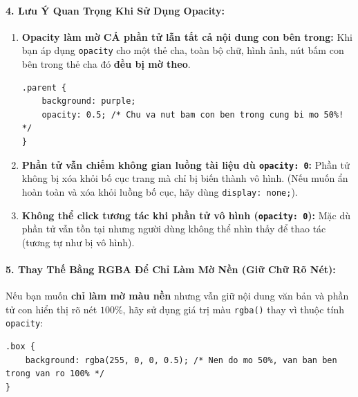 \documentclass[11pt,oneside]{book}
\newcommand{\codeinline}[1]{\textcolor{accentOrange}{\texttt{#1}}}
\begin{document}
\paragraph{4. Lưu Ý Quan Trọng Khi Sử Dụng Opacity:}

\begin{warnBox}
\begin{enumerate}[leftmargin=1.5em, itemsep=4pt, parsep=0pt]
    \item \textbf{Opacity làm mờ CẢ phần tử lẫn tất cả nội dung con bên trong:} Khi bạn áp dụng \codeinline{opacity} cho một thẻ cha, toàn bộ chữ, hình ảnh, nút bấm con bên trong thẻ cha đó \textbf{đều bị mờ theo}.
\begin{codeWindow}
\begin{lstlisting}[language=CSS3]
.parent {
    background: purple;
    opacity: 0.5; /* Chu va nut bam con ben trong cung bi mo 50%! */
}
\end{lstlisting}
\end{codeWindow}

    \item \textbf{Phần tử vẫn chiếm không gian luồng tài liệu dù \codeinline{opacity: 0}:} Phần tử không bị xóa khỏi bố cục trang mà chỉ bị biến thành vô hình. (Nếu muốn ẩn hoàn toàn và xóa khỏi luồng bố cục, hãy dùng \codeinline{display: none;}).

    \item \textbf{Không thể click tương tác khi phần tử vô hình (\codeinline{opacity: 0}):} Mặc dù phần tử vẫn tồn tại nhưng người dùng không thể nhìn thấy để thao tác (tương tự như bị vô hình).
\end{enumerate}
\end{warnBox}

\paragraph{5. Thay Thế Bằng RGBA Để Chỉ Làm Mờ Nền (Giữ Chữ Rõ Nét):}

Nếu bạn muốn \textbf{chỉ làm mờ màu nền} nhưng vẫn giữ nội dung văn bản và phần tử con hiển thị rõ nét $100\%$, hãy sử dụng giá trị màu \codeinline{rgba()} thay vì thuộc tính \codeinline{opacity}:

\begin{codeWindow}
\begin{lstlisting}[language=CSS3]
.box {
    background: rgba(255, 0, 0, 0.5); /* Nen do mo 50%, van ban ben trong van ro 100% */
}
\end{lstlisting}
\end{codeWindow}
\end{document}
